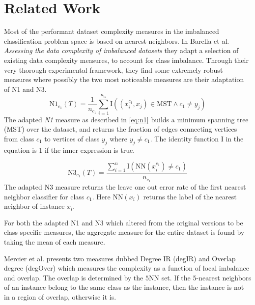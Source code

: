 \documentclass[twoside,leqno,twocolumn]{article}
\begin{document}
\section{Related Work}
\label{sec:related_work}
Most of the performant dataset complexity measures in the imbalanced classification problem space is based on nearest neighbors. 
In Barella et al. \cite{DBLP:journals/isci/BarellaGSLC21} \emph{Assessing the data complexity of imbalanced datasets} they adapt a selection of existing data complexity measures, to account for class imbalance. Through their very thorough experimental framework, they find some extremely robust measures where possibly the two most noticeable measures are their adaptation of N1 and N3.
\begin{equation}
    \label{eq:n1}
     \text{N1}_{c_1}(T)=\frac{1}{n_{c_{1}}}\sum_{i=1}^{n_{c_{1}}}\text{I}((x_i^{c_1},x_j)\in \text{MST} \wedge c_1 \neq y_j)
\end{equation}
The adapted \emph{N1} measure as described in \ref{eq:n1} builds a minimum spanning tree (MST) over the dataset, and returns the fraction of edges connecting vertices from class $c_1$ to vertices of class $y_j$ where  $y_j \neq c_1$. The identity function $\text{I}$ in the equation is 1 if the inner expression is true.

\begin{equation}
    \label{eq:n3}
    \text{N3}_{c_1}(T)=\frac{\sum_{i=1}^{n}\text{I}(\text{NN}(x_i^{c_1}) \neq c_1)}{n_{c_{1}}}
\end{equation} The adapted N3 measure returns the leave one out error rate of the first nearest neighbor classifier for class $c_1$. Here $\text{NN}(x_i)$ returns the label of the nearest neighbor of instance $x_i$. 

For both the adapted N1 and N3 which altered from the original versions to be class specific measures, the aggregate measure for the entire dataset is found by taking the mean of each measure. 

Mercier et al. \cite{DBLP:conf/ida/MercierSASSS18} presents two measures dubbed Degree IR (degIR) and Overlap degree (degOver) which measures the complexity as a function of local imbalance and overlap. The overlap is determined by the $5\text{NN}$ set. If the 5-nearest neighbors of an instance belong to the same class as the instance, then the instance is not in a region of overlap, otherwise it is.  
\end{document}
